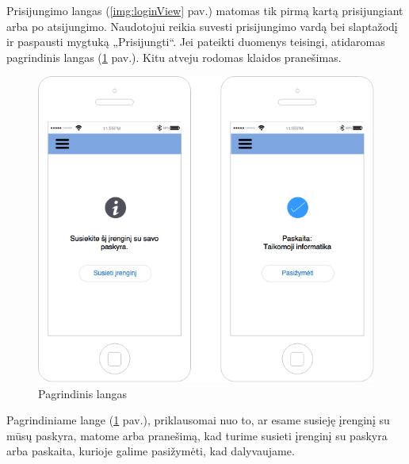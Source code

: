\documentclass{VUMIFPSkursinis}
\begin{document}
Prisijungimo langas (\ref{img:loginView} pav.) matomas tik pirmą kartą prisijungiant arba po atsijungimo. Naudotojui reikia suvesti prisijungimo vardą bei slaptažodį ir paspausti mygtuką „Prisijungti“. Jei pateikti duomenys teisingi, atidaromas pagrindinis langas (\ref{img:mainView} pav.). Kitu atveju rodomas klaidos pranešimas.

\begin{figure}[H]
	\centering
	\includegraphics[scale=0.5]{img/kursinio_app_main}
	\caption{Pagrindinis langas}
	\label{img:mainView}
\end{figure}

Pagrindiniame lange (\ref{img:mainView} pav.), priklausomai nuo to, ar esame susieję įrenginį su mūsų paskyra, matome arba pranešimą, kad turime susieti įrenginį su paskyra arba paskaita, kurioje galime pasižymėti, kad dalyvaujame.
\end{document}
